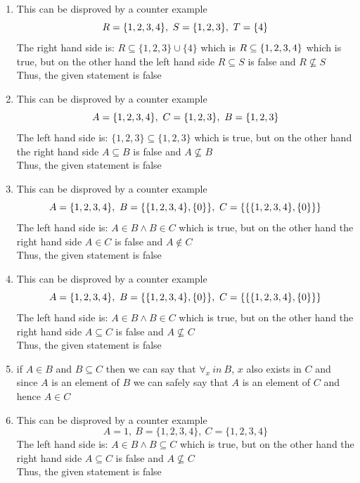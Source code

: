 \documentclass[12pt]{article}
\newenvironment{solution}[2][Solution]{ \begin{trivlist}
\item[\hskip \labelsep {\bfseries #1}]}{\end{trivlist}}
\begin{document}
\begin{solution}{1}
\item[]
\begin{enumerate}[label=\alph*)]
\item This can be disproved by a counter example $$R = \{1,2,3,4\},\ S = \{1,2,3\},\ T = \{4\} \\$$
The right hand side is:
$R \subseteq \{1,2,3\} \cup \{4\}$ which is $R \subseteq \{1,2,3,4\} \\$ which is true, but on the other hand the left hand side $R \subseteq S$ is false and $R \nsubseteq S$ \\
Thus, the given statement is false

\item This can be disproved by a counter example $$A = \{1,2,3,4\},\ C = \{1,2,3\},\ B = \{1,2,3\} \\$$
The left hand side is:
$\{1,2,3\} \subseteq \{1,2,3\}$ which is true, but on the other hand the right hand side $A \subseteq B$ is false and $A \nsubseteq B$ \\
Thus, the given statement is false

\item This can be disproved by a counter example $$A = \{1,2,3,4\},\ B = \{\{1,2,3,4\},\{0\}\},\ C = \{\{\{1,2,3,4\},\{0\}\}\} \\$$
The left hand side is:
$A \in B \wedge B \in C$ which is true, but on the other hand the right hand side $A \in C$ is false and $A \notin C$ \\
Thus, the given statement is false

\item This can be disproved by a counter example $$A = \{1,2,3,4\},\ B = \{\{1,2,3,4\},\{0\}\},\ C = \{\{\{1,2,3,4\},\{0\}\}\} \\$$
The left hand side is:
$A \in B \wedge B \in C$ which is true, but on the other hand the right hand side $A \subseteq C$ is false and $A \nsubseteq C$ \\
Thus, the given statement is false

\item if $A \in B$ and $B \subseteq C$ then we can say that $\forall_x\ in\ B$, $x$ also exists in $C$ and since $A$ is an element of $B$ we can safely say that $A$ is an element of $C$ and hence $A \in C$

\item This can be disproved by a counter example $$A = 1,\ B = \{1,2,3,4\},\ C = \{1,2,3,4\}$$
The left hand side is:
$A \in B \wedge B \subseteq C$ which is true, but on the other hand the right hand side $A \subseteq C$ is false and $A \nsubseteq C$ \\
Thus, the given statement is false
\end{enumerate}
\end{solution}
\end{document}
